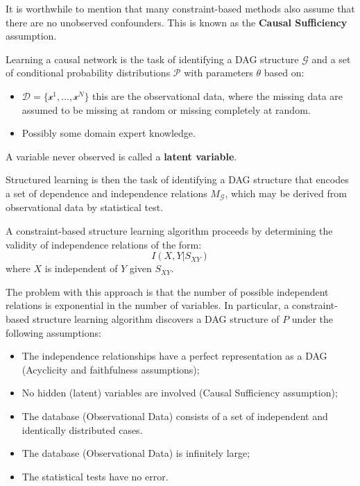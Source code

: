 It is worthwhile to mention that many constraint-based methods also assume that there
are no unobserved confounders. This is known as the \textbf{Causal Sufficiency}
assumption.

Learning a causal network is the task of identifying a DAG structure $\mathcal{G}$
and a set of conditional probability distributions $\mathcal{P}$ with parameters
$\theta$ based on:
\begin{itemize}
    \item $\mathcal{D} = \{\mathcal{x}^1, \ldots, \mathcal{x}^N\}$ this are the
          observational data, where the missing data are assumed to be missing
          at random or missing completely at random.
    \item Possibly some domain expert knowledge.
\end{itemize}

A variable never observed is called a \textbf{latent variable}.

Structured learning is then the task of identifying a DAG structure that encodes
a set of dependence and independence relations $M_{\mathcal{G}}$, which may be
derived from observational data by statistical test.

A constraint-based structure learning algorithm proceeds by determining the validity
of independence relations of the form:
\begin{equation}
    I(X, Y| S_{XY})
\end{equation}
where $X$ is independent of $Y$ given $S_{XY}$.

The problem with this approach is that the number of possible independent relations
is exponential in the number of variables. In particular, a constraint-based
structure learning algorithm discovers a DAG structure of $P$ under the following
assumptions:
\begin{itemize}
    \item The independence relationships have a perfect representation as a DAG
          (Acyclicity and faithfulness assumptions);
    \item No hidden (latent) variables are involved (Causal Sufficiency assumption);
    \item The database (Observational Data) consists of a set of independent and
          identically distributed cases.
    \item The database (Observational Data) is infinitely large;
    \item The statistical tests have no error.
\end{itemize}

